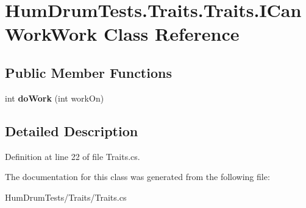 \hypertarget{classHumDrumTests_1_1Traits_1_1Traits_1_1ICanWorkWork}{}\section{Hum\+Drum\+Tests.\+Traits.\+Traits.\+I\+Can\+Work\+Work Class Reference}
\label{classHumDrumTests_1_1Traits_1_1Traits_1_1ICanWorkWork}
\subsection*{Public Member Functions}
\begin{DoxyCompactItemize}
\item 
int {\bfseries do\+Work} (int work\+On)\hypertarget{classHumDrumTests_1_1Traits_1_1Traits_1_1ICanWorkWork_abada2c9d54332b2a44bb92149aef0ac1}{}\label{classHumDrumTests_1_1Traits_1_1Traits_1_1ICanWorkWork_abada2c9d54332b2a44bb92149aef0ac1}

\end{DoxyCompactItemize}


\subsection{Detailed Description}


Definition at line 22 of file Traits.\+cs.



The documentation for this class was generated from the following file\+:\begin{DoxyCompactItemize}
\item 
Hum\+Drum\+Tests/\+Traits/Traits.\+cs\end{DoxyCompactItemize}
